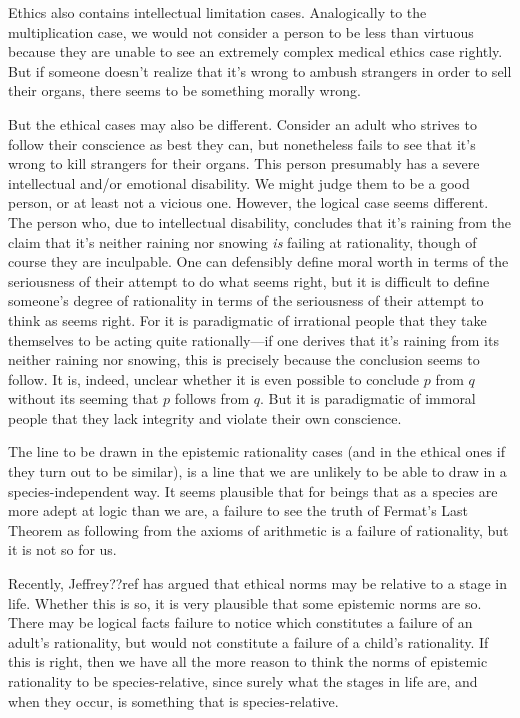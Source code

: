 Ethics also contains intellectual limitation cases. Analogically to the multiplication
case, we would not consider a person to be less than virtuous because they are unable to see an extremely complex medical 
ethics case rightly. But if someone doesn't realize that it's wrong to ambush strangers in order to sell their organs,
there seems to be something morally wrong.

But the ethical cases may also be different. Consider an adult who strives to follow their conscience as best they can,
but nonetheless fails to see that it's wrong to kill strangers for their organs. This person presumably has
a severe intellectual and/or emotional disability. We might judge them to be a good person, or at least not a vicious one. 
However, the logical case seems different. The person who, due to intellectual disability, concludes that it's raining 
from the claim that it's neither raining nor snowing \textit{is} failing at rationality, though of course they are 
inculpable. One can defensibly define moral worth in terms of the seriousness of their attempt to do what seems right, but
it is difficult to define someone's degree of rationality in terms of the seriousness of their attempt to think as seems
right. For it is paradigmatic of irrational people that they take themselves to be acting quite rationally---if one
derives that it's raining from its neither raining nor snowing, this is precisely because the conclusion seems to follow.
It is, indeed, unclear whether it is even possible to conclude $p$ from $q$ without its seeming that $p$ follows from $q$.
But it is paradigmatic of immoral people that they lack integrity and violate their own conscience. 

The line to be drawn in the epistemic rationality cases (and in the ethical ones if they turn out to be similar), is a line that we 
are unlikely to be able to draw in a species-independent way. It seems plausible that for beings that as a species are 
more adept at logic than we are, a failure to see the truth of Fermat's Last Theorem as following from the axioms of
arithmetic is a failure of rationality, but it is not so for us. 

Recently, Jeffrey??ref has argued that ethical norms may be relative to a stage in life. Whether this is so, it is very
plausible that some epistemic norms are so. There may be logical facts failure to notice which constitutes a failure of 
an adult's rationality, but would not constitute a failure of a child's rationality. If this is right, then we have all
the more reason to think the norms of epistemic rationality to be species-relative, since surely what the stages in 
life are, and when they occur, is something that is species-relative.

